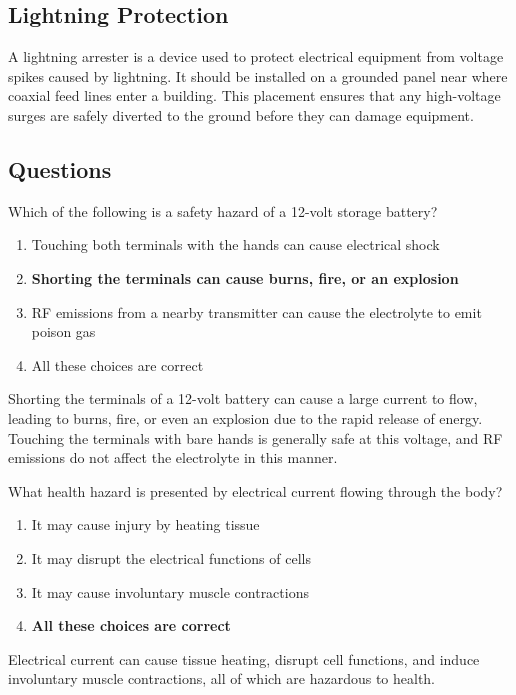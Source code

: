 \subsection*{Lightning Protection}
A lightning arrester is a device used to protect electrical equipment from voltage spikes caused by lightning. It should be installed on a grounded panel near where coaxial feed lines enter a building. This placement ensures that any high-voltage surges are safely diverted to the ground before they can damage equipment.

\subsection*{Questions}
\begin{tcolorbox}[colback=gray!10!white,colframe=black!75!black,title={T0A01}]
    Which of the following is a safety hazard of a 12-volt storage battery?
    \begin{enumerate}[label=\Alph*,noitemsep]
        \item Touching both terminals with the hands can cause electrical shock
        \item \textbf{Shorting the terminals can cause burns, fire, or an explosion}
        \item RF emissions from a nearby transmitter can cause the electrolyte to emit poison gas
        \item All these choices are correct
    \end{enumerate}
\end{tcolorbox}
Shorting the terminals of a 12-volt battery can cause a large current to flow, leading to burns, fire, or even an explosion due to the rapid release of energy. Touching the terminals with bare hands is generally safe at this voltage, and RF emissions do not affect the electrolyte in this manner.


\begin{tcolorbox}[colback=gray!10!white,colframe=black!75!black,title={T0A02}]
    What health hazard is presented by electrical current flowing through the body?
    \begin{enumerate}[label=\Alph*,noitemsep]
        \item It may cause injury by heating tissue
        \item It may disrupt the electrical functions of cells
        \item It may cause involuntary muscle contractions
        \item \textbf{All these choices are correct}
    \end{enumerate}
\end{tcolorbox}
Electrical current can cause tissue heating, disrupt cell functions, and induce involuntary muscle contractions, all of which are hazardous to health.

